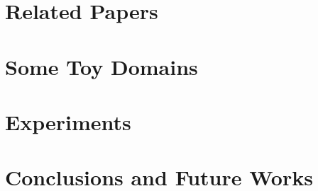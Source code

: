 \documentclass{article}
\begin{document}
\section{Related Papers}
\label{review}


\clearpage
\newpage

\section{Some Toy Domains}
\label{review:toy}



\section{Experiments}
\label{review:expt}



\section{Conclusions and Future Works}
\label{review:conc}


\clearpage
\newpage




\end{document}
